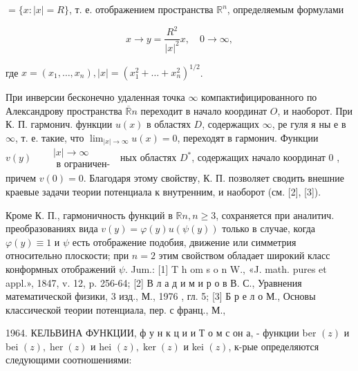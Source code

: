 \documentclass[10pt]{article}
\begin{document}
$=\{x:|x|=R\}$, т. е. отображением пространства $\mathbb{R}^{n}$, определяемым формулами



\[

x \rightarrow y=\frac{R^{2}}{|x|^{2}} x, \quad 0 \rightarrow \infty,

\]



где $x=\left(x_{1}, \ldots, x_{n}\right),|x|=\left(x_{1}^{2}+\ldots+x_{n}^{2}\right)^{1 / 2}$.



При инверсии бесконечно удаленная точка $\infty$ компактифицированного по Александрову пространства $\overline{\mathbb{R}} n$ переходит в начало координат $O$, и наоборот. При К. П. гармонич. функции $u(x)$ в областях $D$, содержащих $\infty$, ре гуля я ны е в $\infty$, т. е. такие, что $\lim _{|x| \rightarrow \infty} u(x)=0$, переходят в гармонич. Функции $v(y) \quad \begin{aligned} & |x| \rightarrow \infty \\ & \text { в ограничен- }\end{aligned}$ ных областях $D^{*}$, содержащих начало координат 0 , причем $v(0)=0$. Благодаря этому свойству, К. П. позволяет сводить внешние краевые задачи теории потенциала к внутренним, и наоборот (см. [2], [3]).



Кроме К. П., гармоничность функций в $\mathbb{R} n, n \geqslant 3$, сохраняется при аналитич. преобразованиях вида $v(y)=\varphi(y) u(\psi(y))$ только в случае, когда $\varphi(y) \equiv 1$ и $\psi$ есть отображение подобия, движение или симметрия относительно плоскости; при $n=2$ этим свойством обладает широкий класс конформных отображений $\psi$. Jum.: [1] T h om s o n W., «J. math. pures et appl.», 1847, v. 12, p. 256-64; [2] В л а д и м и р о в В. С., Уравнения математической физики, 3 изд., М., 1976 , гл. 5; [3] Б р е л о М., Основы классической теории потенциала, пер. с франц., М.,

1964. КЕЛЬВИНА ФУНКЦИИ, ф у н к ц и и Т о м с он а, - функции ber $(z)$ и bei $(z), \operatorname{her}(z)$ и hei $(z), \operatorname{ker}(z)$ и kei $(z)$, к-рые определяются следующими соотношениями:
\end{document}

